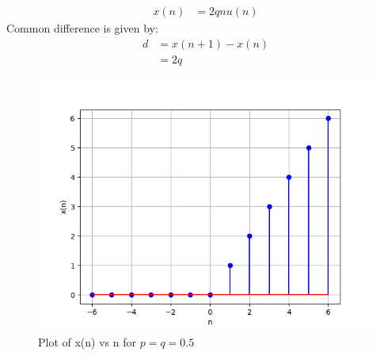 \documentclass[journal,12pt,twocolumn]{IEEEtran}
\theoremstyle{remark}
\begin{document}
\begin{align}
    x(n) &= 2qnu(n)
\end{align}
Common difference is given by:
\begin{align}
    d &= x(n+1) - x(n)\\
    &= 2q
\end{align}
\begin{figure}[!h]
    \centering
    \includegraphics[width = \columnwidth]{figs/x_plot.png}
    \caption{Plot of x(n) vs n for $p=q=0.5$}
    \label{fig:1}
\end{figure}
\end{document}
